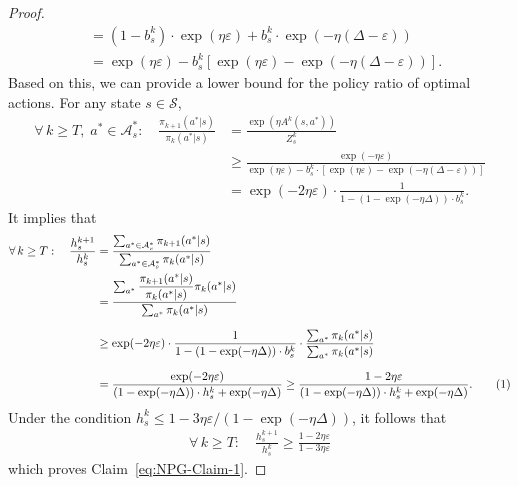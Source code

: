 \documentclass[10pt,a4paper]{amsart}
\newcommand\numberthis{\addtocounter{equation}{1}\tag{\theequation}}
\newcommand{\calA}{\mathcal{A}}
\newcommand{\calS}{\mathcal{S}}
\newcommand{\ls}{\left}
\newcommand{\rs}{\right}
\begin{document}
\begin{proof}
\begin{align*}
        &= (1-b_s^k) \cdot \exp(\eta\varepsilon) + b_s^k \cdot \exp(-\eta(\Delta-\varepsilon)) \\[.5em]
        &= \exp(\eta \varepsilon) - b_s^k \ls[ \exp(\eta\varepsilon) - \exp(-\eta (\Delta - \varepsilon)) \rs].
    \end{align*}
    Based on this,  we can provide a lower bound for the policy ratio of optimal actions. For any state $s\in\calS$,
    \begin{align*}
        \forall\, k \geq T, \; a^*\in\calA^*_s : \quad \frac{\pi_{k+1}(a^*|s)}{\pi_k(a^*|s)} &= \frac{\exp(\eta A^k(s,a^*))}{Z_s^k} \\
        &\geq \frac{\exp(-\eta\varepsilon)}{\exp(\eta\varepsilon) - b_s^k \cdot \ls[ \exp(\eta\varepsilon) - \exp(-\eta (\Delta - \varepsilon)) \rs]} \\[.7em]
        &= \exp(-2\eta\varepsilon) \cdot \frac{1}{1-(1-\exp(-\eta\Delta)) \cdot b_s^k}. 
    \end{align*}
    It implies that
    \begin{align*}
        \forall\, k \geq T: \quad \frac{h_s^{k+1}}{h_s^k} &= \frac{\sum_{a^*\in\calA^*_s} \pi_{k+1}(a^*|s)}{\sum_{a^*\in\calA^*_s} \pi_k(a^*|s)} \\
        &= \frac{\sum_{a^*} \dfrac{\pi_{k+1}(a^*|s)}{\pi_k(a^*|s)} \pi_k(a^*|s)}{\sum_{a^*} \pi_k(a^*|s)} \\[.7em]
        &\geq \exp(-2\eta\varepsilon) \cdot \frac{1}{1-(1-\exp(-\eta\Delta)) \cdot b_s^k} \cdot  \frac{\sum_{a^*} \pi_k(a^*|s)}{\sum_{a^*} \pi_k(a^*|s)} \\[.7em]
        &= \frac{\exp(-2\eta\varepsilon)}{(1-\exp(-\eta\Delta)) \cdot h_s^k  + \exp(-\eta\Delta)} \geq \frac{1-2\eta\varepsilon}{(1-\exp(-\eta\Delta)) \cdot h_s^k  + \exp(-\eta\Delta)}. \numberthis \label{eq:bound-of-h-k-ratio}
    \end{align*}
    Under the condition $h_s^k \leq 1 - 3\eta\varepsilon / (1-\exp(-\eta\Delta))$, it follows that
    \begin{align*}
        \forall\, k \geq T: \quad \frac{h_s^{k+1}}{h_s^k} \geq \frac{1-2\eta\varepsilon}{1-3\eta\varepsilon}
    \end{align*}
    which proves Claim~\ref{eq:NPG-Claim-1}.


\end{proof}
\end{document}
